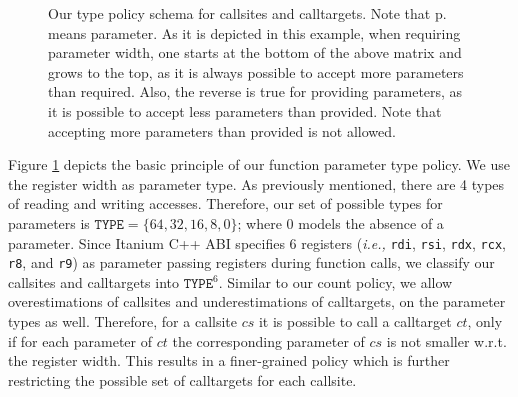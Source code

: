 \begin{figure}[h!]
{
}
\caption{Our type policy schema for callsites and calltargets. Note that p. means parameter. As it is depicted in this example, when requiring parameter width, one starts at the 
bottom of the above matrix and grows to the top, as it is always possible to accept more parameters than required.
Also, the reverse is true for providing parameters, as it is possible to accept less parameters than provided.
Note that accepting more parameters than provided is not allowed.}
\label{fig:TYPEschema}
\end{figure}

Figure \ref{fig:TYPEschema} depicts the basic principle of our function parameter type policy.
We use the register width as parameter type. As previously mentioned, there are 4 types 
of reading and writing accesses. Therefore, our set of possible types for parameters is $\texttt{TYPE} = \{64, 32, 16, 8, 0\}$; where 0 models the absence of a 
parameter. Since Itanium C++ ABI specifies 6 registers (\textit{i.e.,} \texttt{rdi}, \texttt{rsi}, \texttt{rdx}, \texttt{rcx}, \texttt{r8}, and \texttt{r9}) as 
parameter passing registers during function calls, we classify our callsites and calltargets into $\texttt{TYPE}^6$. Similar to
our count policy, we allow overestimations of callsites and underestimations of calltargets, on the parameter types as well. Therefore, for a 
callsite $cs$ it is possible to call a calltarget $ct$, only if for each parameter of $ct$ the corresponding parameter of $cs$ is not smaller w.r.t. the register width.
This results in a finer-grained policy which is further restricting the possible set of calltargets for each callsite.

